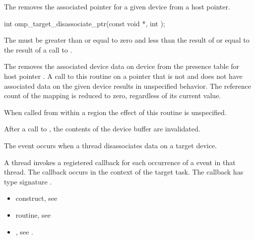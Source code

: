 \begin{ccppspecific}
The  removes the associated pointer for a
given device from a host pointer.

\begin{figure}[t!]
\end{figure}

\format
\begin{ompcFunction}
int omp_target_disassociate_ptr(const void *, int );
\end{ompcFunction}

\constraints


The 
must be greater than or equal to zero and less than the result of
 or equal to the result of a call to
.

\effect

The  removes the associated device data
on device  from the presence table for host pointer
. A call to this routine on a pointer that is not 
 and does not have associated data on the given device results
in unspecified behavior.  The reference count of the mapping is reduced to 
zero, regardless of its current value.

When called from within a  region 
the effect of this routine is unspecified.

After a call to , the contents of the device
buffer are invalidated.

\events
The  event occurs when a thread disassociates data on a target device.

\tools

A thread invokes a registered 
callback for each occurrence of a  event in that thread. 
The callback occurs in the context of the target task.  The callback has type signature
. 


\crossreferences
\begin{itemize}
\item {} construct, see 
\item {} routine, see 
\item {}, see 
.

\end{itemize}

\end{ccppspecific}
